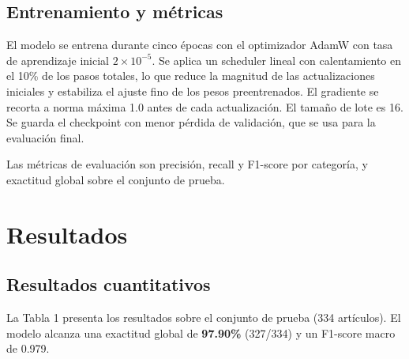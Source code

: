 \documentclass[letterpaper, 10 pt, conference]{latex_template/ieeeconf}
\begin{document}
\subsection{Entrenamiento y métricas}

El modelo se entrena durante cinco épocas con el optimizador AdamW con tasa de aprendizaje inicial $2 \times 10^{-5}$. Se aplica un scheduler lineal con calentamiento en el 10\% de los pasos totales, lo que reduce la magnitud de las actualizaciones iniciales y estabiliza el ajuste fino de los pesos preentrenados. El gradiente se recorta a norma máxima 1.0 antes de cada actualización. El tamaño de lote es 16. Se guarda el checkpoint con menor pérdida de validación, que se usa para la evaluación final.

Las métricas de evaluación son precisión, recall y F1-score por categoría, y exactitud global sobre el conjunto de prueba.

\section{Resultados}

\subsection{Resultados cuantitativos}

La Tabla 1 presenta los resultados sobre el conjunto de prueba (334 artículos). El modelo alcanza una exactitud global de \textbf{97.90\%} (327/334) y un F1-score macro de 0.979.

\begin{table}[h]
\centering
\caption{Precisión, recall y F1-score por categoría en el conjunto de prueba.}
\end{table}
\end{document}
